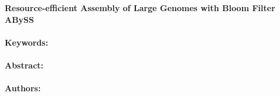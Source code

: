 \noindent
\large {\bf Resource-efficient Assembly of Large Genomes with Bloom Filter ABySS} 


\normalsize 


\noindent \paragraph{Keywords:} 

\noindent \paragraph{Abstract:} 



\noindent \paragraph{Authors:} 

